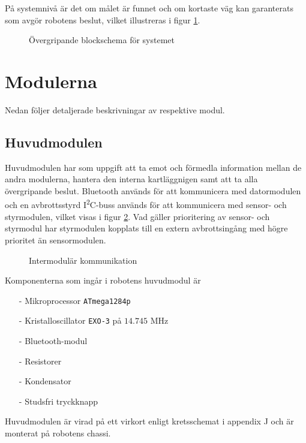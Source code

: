 \documentclass[11pt]{article}
\begin{document}
\begin{flushleft}
På systemnivå är det om målet är funnet och om kortaste väg kan garanterats som avgör robotens beslut, vilket illustreras i figur \ref{blockSystem}.

\begin{figure}[htbp]
\centering
\noindent\resizebox{1\linewidth}{!}{
	}
	\caption{Övergripande blockschema för systemet}	\label{blockSystem}
\end{figure}

\pagebreak
\section{Modulerna}
Nedan följer detaljerade beskrivningar av respektive modul.

\subsection{Huvudmodulen}
Huvudmodulen har som uppgift att ta emot och förmedla information mellan de andra modulerna, hantera den interna kartläggnigen samt att ta alla övergripande beslut. Bluetooth\textsuperscript{\circledR} används för att kommunicera med datormodulen och en avbrottsstyrd I\textsuperscript{2}C-buss används för att kommunicera med sensor- och styrmodulen, vilket visas i figur \ref{communication}. Vad gäller prioritering av sensor- och styrmodul har styrmodulen kopplats till en extern avbrottsingång med högre prioritet än sensormodulen.

\begin{figure}[htbp]
\noindent\resizebox{.97\textwidth}{!}{
	}
	\caption{Intermodulär kommunikation \label{communication}}
\end{figure}

Komponenterna som ingår i robotens huvudmodul är 
\begin{itemize}
  \item[-] Mikroprocessor \verb+ATmega1284p+
  \item[-] Kristalloscillator \verb+EXO-3+ på $14.745$ MHz
  \item[-] Bluetooth\textsuperscript{\circledR}-modul
  \item[-] Resistorer
  \item[-] Kondensator
  \item[-] Studsfri tryckknapp
\end{itemize}

Huvudmodulen är virad på ett virkort enligt kretsschemat i appendix J och är monterat på robotens chassi. 


\end{flushleft}
\end{document}
